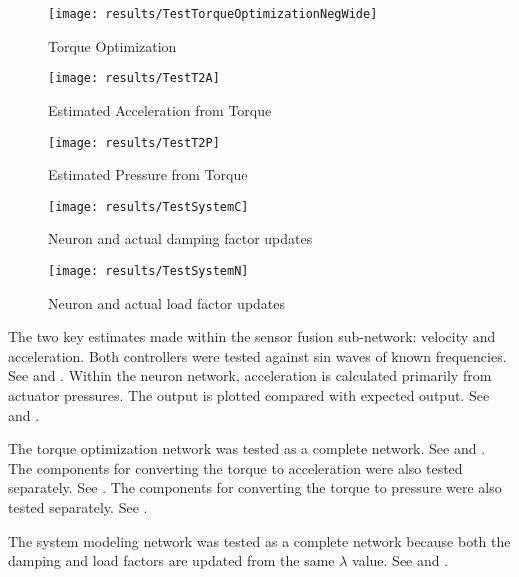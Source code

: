 \begin{figure}
\centering
\texttt{[image: results/TestTorqueOptimizationNegWide]}
\caption{Torque Optimization}
\label{fig:TestTorqueOptimizationNeg}
\end{figure}

\begin{figure}
\centering
\texttt{[image: results/TestT2A]}
\caption{Estimated Acceleration from Torque}
\label{fig:TestT2A}
\end{figure}

\begin{figure}
\centering
\texttt{[image: results/TestT2P]}
\caption{Estimated Pressure from Torque}
\label{fig:TestT2P}
\end{figure}

\begin{figure}
\centering
\texttt{[image: results/TestSystemC]}
\caption{Neuron and actual damping factor updates}
\label{fig:TestSystemC}
\end{figure}

\begin{figure}
\centering
\texttt{[image: results/TestSystemN]}
\caption{Neuron and actual load factor updates}
\label{fig:TestSystemN}
\end{figure}


The two key estimates made within the sensor fusion sub-network: velocity and
acceleration. Both controllers were tested against sin waves of known
frequencies. See  and .
Within the neuron network, acceleration is calculated primarily from actuator
pressures. The output is plotted compared with expected output. See
 and .


The torque optimization network was tested as a complete network. See
 and .
The components for converting the torque to
acceleration were also tested
separately. See .
The components for converting the torque to pressure were also tested
separately. See .


The system modeling network was tested as a complete network because both the
damping and load factors are updated from the same $\lambda$ value. See  and .

